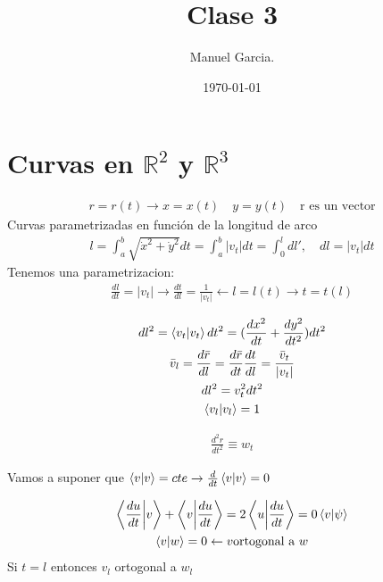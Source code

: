 \documentclass{article}
\title{Clase 3 }
\author{Manuel Garcia.}
\date{\today}
\newcommand{\caja}[3]{%
  \begin{tcolorbox}[colback=#1!5!white,colframe=#1!25!black,title=#2]
    #3
  \end{tcolorbox}%
}
\begin{document}
\maketitle

\section{Curvas en $ \mathbb{R}^2   $ y $ \mathbb{R}^3  $}
\caja{red}{Curvas en $ \mathbb{R}^3   $}{
  \begin{gather}
    r = r(t) \rightarrow x = x(t) \quad y = y(t) \quad \text{r es un vector} 
    \label{eq:curva_r2}
  \end{gather}
  Curvas parametrizadas en función de la longitud de arco
  \begin{gather}
    l = \int_{a }^{b }\sqrt{\dot x^2 + \dot y^2  }dt = \int_{a }^{b }|v_t| dt = \int_{0 }^{l} dl', \quad dl = |v_t|dt 
    \label{eq:param_long_arco}
  \end{gather}
  Tenemos una parametrizacion:
  \begin{gather}
     \frac{d l }{d t} = |v_t | \rightarrow \frac{d t }{d l} = \frac{1}{|v_t|} \leftarrow l = l(t) \rightarrow t = t(l)  
  \end{gather}
}
\begin{gather}
   dl^2 = \bra{v_t }\ket{v_t }dt^2 = (\frac{d x^2  }{d t }+ \frac{d y^2  }{d t^2 }) dt^2 \\
   \bar v_l = \frac{d \bar r  }{d l } = \frac{d \bar r  }{d t }\frac{d t  }{d l } = \frac{\bar v_t }{|v_t|}\\
   dl^2 = v_t^2 dt^2 \\
   \bra{v_l }\ket{v_l} = 1  
\end{gather}
\caja{green}{Aceleracion }{
  \begin{gather}
    \frac{d ^2 r  }{d t^2 } \equiv w_t    
    \label{eq:aceleracion }
  \end{gather}
}
Vamos a suponer que $ \bra{v}\ket{v} = cte  \rightarrow \frac{d  }{d t}\bra{v}\ket{v} = 0  $

\begin{gather}
  \bra{\frac{d u }{d t}  }\ket{v}+\bra{v}\ket{\frac{d u  }{d t}} = 2 \bra{u }\ket{\frac{d u  }{d t}  } = 0 
  \bra{v}\ket{\psi} \\
  \bra{v }\ket{w } = 0 \leftarrow v \text{ortogonal a } w   
\end{gather}
Si $ t = l  $ entonces $v_l$ ortogonal a $w_l$ 
\end{document}

